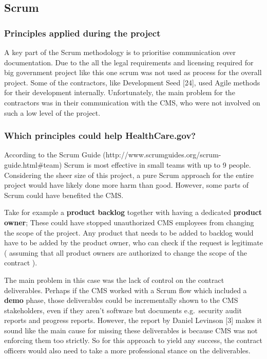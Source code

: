 \documentclass[]{article}
\begin{document}
\subsection{Scrum}\label{scrum}

\subsubsection{Principles applied during the
project}\label{principles-applied-during-the-project}

A key part of the Scrum methodology is to prioritise communication over
documentation. Due to the all the legal requirements and licensing
required for big government project like this one scrum was not used as
process for the overall project. Some of the contractors, like
Development Seed {[}24{]}, used Agile methods for their development
internally. Unfortunately, the main problem for the contractors was in
their communication with the CMS, who were not involved on such a low
level of the project.

\subsubsection{Which principles could help
HealthCare.gov?}\label{which-principles-could-help-healthcare.gov}

According to the Scrum Guide
(http://www.scrumguides.org/scrum-guide.html\#team) Scrum is most
effective in small teams with up to 9 people. Considering the sheer size
of this project, a pure Scrum approach for the entire project would have
likely done more harm than good. However, some parts of Scrum could have
benefited the CMS.

Take for example a \textbf{product backlog} together with having a
dedicated \textbf{product owner}; These could have stopped unauthorized
CMS employees from changing the scope of the project. Any product that
needs to be added to backlog would have to be added by the product
owner, who can check if the request is legitimate ( assuming that all
product owners are authorized to change the scope of the contract ).

The main problem in this case was the lack of control on the contract
deliverables. Perhaps if the CMS worked with a Scrum flow which included
a \textbf{demo} phase, those deliverables could be incrementally shown
to the CMS stakeholders, even if they aren't software but documents
e.g.~security audit reports and progress reports. However, the report by
Daniel Levinson {[}3{]} makes it sound like the main cause for missing
these deliverables is because CMS was not enforcing them too strictly.
So for this approach to yield any success, the contract officers would
also need to take a more professional stance on the deliverables.
\end{document}
